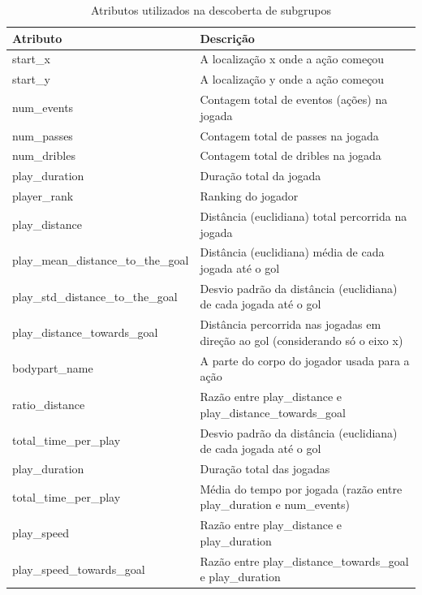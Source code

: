 \documentclass{article}
\begin{document}
\begin{table}[H]
    \centering
    \begin{tabularx}{\textwidth}{|l|X|}
        \hline
        \textbf{Atributo} & \textbf{Descrição} \\
        \hline
        start\_x & A localização x onde a ação começou \\
        \hline
        start\_y & A localização y onde a ação começou \\
        \hline
        num\_events & Contagem total de eventos (ações) na jogada \\
        \hline
        num\_passes & Contagem total de passes na jogada \\
        \hline
        num\_dribles & Contagem total de dribles na jogada \\
        \hline
        play\_duration & Duração total da jogada \\
        \hline
        player\_rank & Ranking do jogador \\
        \hline
        play\_distance & Distância (euclidiana) total percorrida na jogada \\
        \hline
        play\_mean\_distance\_to\_the\_goal & Distância (euclidiana) média de cada jogada até o gol \\
        \hline
        play\_std\_distance\_to\_the\_goal & Desvio padrão da distância (euclidiana) de cada jogada até o gol \\
        \hline
        play\_distance\_towards\_goal & Distância percorrida nas jogadas em direção ao gol (considerando só o eixo x) \\
        \hline
        bodypart\_name & A parte do corpo do jogador usada para a ação \\
        \hline
        ratio\_distance & Razão entre play\_distance e play\_distance\_towards\_goal \\
        \hline
        total\_time\_per\_play & Desvio padrão da distância (euclidiana) de cada jogada até o gol \\
        \hline
        play\_duration & Duração total das jogadas \\
        \hline
        total\_time\_per\_play & Média do tempo por jogada (razão entre play\_duration e num\_events) \\
        \hline
        play\_speed & Razão entre play\_distance e play\_duration \\
        \hline
        play\_speed\_towards\_goal & Razão entre play\_distance\_towards\_goal e play\_duration \\
        \hline
    \end{tabularx}
    \caption{Atributos utilizados na descoberta de subgrupos}
    \label{tab:atributosSD}
\end{table}
\end{document}
